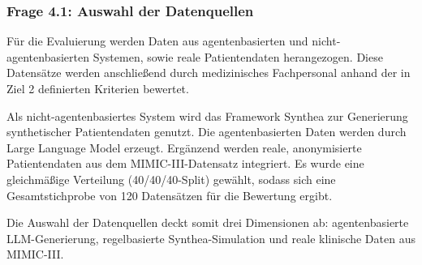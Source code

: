 \subsubsection{Frage 4.1: Auswahl der Datenquellen}
\begin{description}[style=nextline, font=\bfseries]
    \item[Methodik] Für die Evaluierung werden Daten aus agentenbasierten und nicht-agentenbasierten Systemen, sowie reale Patientendaten herangezogen. Diese Datensätze werden anschließend durch medizinisches Fachpersonal anhand der in Ziel 2 definierten Kriterien bewertet.
    \item[Ergebnisse] Als nicht-agentenbasiertes System wird das Framework Synthea zur Generierung synthetischer Patientendaten genutzt. Die agentenbasierten Daten werden durch Large Language Model erzeugt. Ergänzend werden reale, anonymisierte Patientendaten aus dem MIMIC-III-Datensatz integriert. Es wurde eine gleichmäßige Verteilung (40/40/40-Split) gewählt, sodass sich eine Gesamtstichprobe von 120 Datensätzen für die Bewertung ergibt.
    \item[Beantwortung] Die Auswahl der Datenquellen deckt somit drei Dimensionen ab: agentenbasierte LLM-Generierung, regelbasierte Synthea-Simulation und reale klinische Daten aus MIMIC-III.
\end{description}

